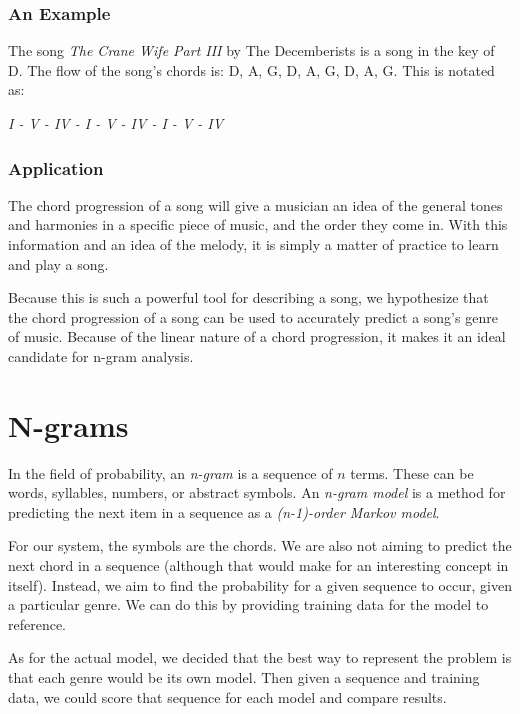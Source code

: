 \documentclass{article}
\begin{document}
		\subsubsection{An Example}
		The song \emph{The Crane Wife Part III} by The Decemberists is a song 
		in the key of D.  The flow of the song's chords is:  D, A, G, D, A, G, D, A, G.  
		This is notated as:\\

		\begin{center}
		\emph{I - V - IV - I - V - IV - I - V - IV}
		\end{center}

		\subsubsection{Application}
		The chord progression of a song will give a musician an idea of the general 
		tones and harmonies in a specific piece of music, and the order they 
		come in.  With this information and an idea of the melody, it is simply 
		a matter of practice to learn and play a song.

		Because this is such a powerful tool for describing a song, we hypothesize 
		that the chord progression of a song can be used to accurately predict a 
		song's genre of music.  Because of the linear nature of a chord progression, 
		it makes it an ideal candidate for n-gram analysis.
  
\newpage

\section{N-grams}

In the field of probability, an \emph{n-gram} is a sequence of $n$ terms. These can be
words, syllables, numbers, or abstract symbols. An \emph{n-gram model} is a method
for predicting the next item in a sequence as a \emph{(n-1)-order Markov model}. 

For our system, the symbols are the chords. We are also not aiming to predict the
next chord in a sequence (although that would make for an interesting concept in
itself). Instead, we aim to find the probability for a given sequence to occur, given
a particular genre. We can do this by providing training data for the model to reference.

As for the actual model, we decided that the best way to represent the problem is
that each genre would be its own model. Then given a sequence and training data,
we could score that sequence for each model and compare results. 
\end{document}
